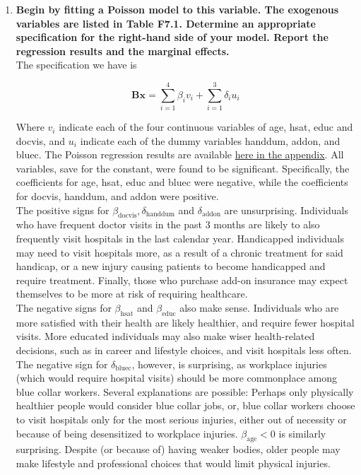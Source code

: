 \documentclass{article}
\begin{document}
\begin{enumerate}[label=(\alph*)]
\item \textbf{Begin by fitting a Poisson model to this variable. The exogenous variables are listed in Table F7.1. Determine an appropriate specification for the right-hand side of your model. Report the regression results and the marginal effects.}\\

The specification we have is 

	$$ \textbf{Bx}= \sum_{i=1}^4\beta_i v_i + \sum_{i=1}^3 \delta_i u_i$$

Where $v_i$ indicate each of the four continuous variables of age, hsat, educ and docvis, and $u_i$ indicate each of the dummy variables handdum, addon, and bluec. The Poisson regression results are available \hyperlink{poisson}{here in the appendix}. All variables, save for the constant, were found to be significant. Specifically, the coefficients for age, hsat, educ and bluec were negative, while the coefficients for docvis, handdum, and addon were positive.\\

The positive signs for $\beta_{\text{docvis}}, \delta_{\text{handdum}}$ and $\delta_{\text{addon}}$ are unsurprising. Individuals who have frequent doctor visits in the past 3 months are likely to also frequently visit hospitals in the last calendar year. Handicapped individuals may need to visit hospitals more, as a result of a chronic treatment for said handicap, or a new injury causing patients to become handicapped and require treatment. Finally, those who purchase add-on insurance may expect themselves to be more at risk of requiring healthcare. \\

The negative signs for $\beta_{\text{hsat}}$ and $\beta_{\text{educ}}$ also make sense. Individuals who are more satisfied with their health are likely healthier, and require fewer hospital visits. More educated individuals may also make wiser health-related decisions, such as in career and lifestyle choices, and visit hospitals less often. The negative sign for $\delta_{\text{bluec}}$, however, is surprising, as workplace injuries (which would require hospital visits) should be more commonplace among blue collar workers. Several explanations are possible: Perhaps only physically healthier people would consider blue collar jobs, or, blue collar workers choose to visit hospitals only for the most serious injuries, either out of necessity or because of being desensitized to workplace injuries. $\beta_{\text{age}} < 0$ is similarly surprising. Despite (or because of) having weaker bodies, older people may make lifestyle and professional choices that would limit physical injuries.\\
 

\end{enumerate}
\end{document}

